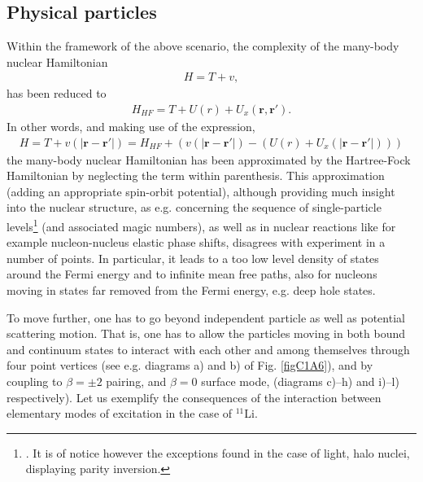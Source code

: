 \subsection{Physical particles}\label{sect1.9.2}
Within the framework of the above scenario, the  complexity of the many-body nuclear Hamiltonian
\begin{align}
H=T+v,
\end{align}
has been reduced to
\begin{align}
H_{HF}=T+U(r)+U_x(\mathbf r,\mathbf r').
\end{align}
In other words, and making use of the expression,
\begin{align}\label{eq1.9.7}
H=T+v(|\mathbf r- \mathbf r'|)=H_{HF}+\left(v(|\mathbf r- \mathbf r'|)-(U(r)+U_x(|\mathbf r- \mathbf r'|))\right)
\end{align}
the  many-body nuclear Hamiltonian has been approximated by the Hartree-Fock Hamiltonian
by neglecting the term within parenthesis. This approximation (adding an appropriate spin-orbit potential), although providing much insight into the nuclear structure,  as e.g. concerning the sequence of single-particle levels\footnote{\cite{Mayer:55}. It is of notice however the exceptions found in the case of light, halo nuclei, displaying parity inversion.} (and associated magic numbers), as well as in nuclear reactions like for example  nucleon-nucleus elastic phase shifts, disagrees with experiment in a number of points. In particular, it leads to a too low level density of states around the Fermi energy and to  infinite mean free paths, also for nucleons moving in states far removed from the Fermi energy, e.g. deep hole states. 

To move further, one has to go beyond independent particle as well as  potential scattering motion. That is, one has  to allow the particles moving in both bound and continuum states to interact with each other and among themselves through four point vertices (see e.g.  diagrams a) and b) of Fig. \ref{figC1A6}), and by coupling to $\beta=\pm2$ pairing, and $\beta=0$ surface mode, (diagrams c)--h) and i)--l) respectively). 
Let us exemplify the consequences of the interaction between  elementary modes of excitation in the case of $^{11}$Li.
